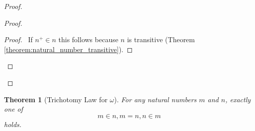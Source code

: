 \documentclass{report}
\let\qed\relax
\newtheorem{theorem}[axiom]{Theorem}
\theoremstyle{definition}
\begin{document}
    \begin{proof}
        \pf
        \begin{proof}
            \begin{proof}
                \pf\ If $n^+ \in n$ this follows because $n$ is transitive (Theorem \ref{theorem:natural_number_transitive}).
            \end{proof}
        \end{proof}
        \qed
    \end{proof}

    \begin{theorem}[Trichotomy Law for $\omega$]
        For any natural numbers $m$ and $n$, exactly one of
        \[ m \in n, m = n, n \in m \]
        holds.
    \end{theorem}
\end{document}
